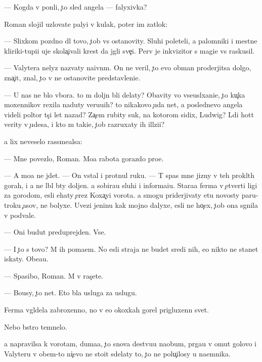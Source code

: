 \documentclass[10pt]{book}
\begin{document}
— Kogda v{\yi} pon{\ia}li, {\c}to sled angela — falyxivka?

Roman slojil uzlovat{\yi}{\y}e paly{\q}i v kulak, poter im zat{\yi}lok:

— Slixkom pozdno dl{\ia} tovo, {\c}tob{\yi} vs{\e} ostanovity. Sluhi poleteli, a palomniki i mestn{\yi}{\y}e kliriki-tupi{\q}i uje skola{\c}ivali krest da jgli sve{\c}i. Perv{\yi}{\y} je inkvizitor s magi{\y}e{\y} vs{\e} raskusil.

— Valytera nelyz{\ia} nazvaty na{\y}ivn{\yi}m. On ne veril, {\c}to {\y}evo obman proderjitsa dolgo, zna{\c}it, znal, {\c}to v{\yi} ne ostanovite predstavleni{\y}e.

— U nas ne b{\yi}lo v{\yi}bora. {\C}to m{\yi} doljn{\yi} b{\yi}li delaty? Ob{\y}avity vo vseusl{\yi}xani{\y}e, {\c}to ku{\c}ka moxennikov rexila naduty veru{\y}u{\x}ih? {\C}to nikakovo {\c}uda net, a poslednevo angela videli poltor{\yi} t{\yi}s{\ia}{\c}i let nazad? Za{\c}em rubity suk, na kotorom sidix, Ludwig? L{\iu}di hot{\ia}t verity v {\c}udesa, i kto m{\yi} taki{\y}e, {\c}tob{\yi} razruxaty ih ill{\iu}zi{\y}i?

{\Y}a lix neveselo rassme{\y}alsa:

— Mne povezlo, Roman. Mo{\y}a rabota gorazdo pro{\x}e.

— A mo{\y}a ne jdet. — On vstal i prot{\ia}nul ruku. — T{\yi} spas mne jizny v teh prokl{\ia}t{\yi}h gorah, i {\y}a ne l{\iu}bl{\iu} b{\yi}ty doljen. {\Y}a sobira{\y}u sluhi i informa{\q}i{\y}u. Stara{\y}a ferma v {\c}etverti ligi za gorodom, {\y}esli {\y}ehaty {\c}erez Koxa{\c}yi vorota. {\Y}a smogu priderjivaty etu novosty paru-tro{\y}ku {\c}asov, ne bolyxe. Uvezi jen{\x}inu kak mojno dalyxe, {\y}esli ne ho{\c}ex, {\c}tob{\yi} ona sgnila v podvale.

— Oni budut preduprejden{\yi}. Vse.

— I {\c}to s tovo? M{\yi} ih po{\y}ma{\y}em. No {\y}esli straja ne budet sredi nih, {\y}e{\y}o nikto ne stanet iskaty. Obe{\x}a{\y}u.

— Spasibo, Roman. M{\yi} v ras{\c}ete.

— Bo{\y}usy, {\c}to net. Eto b{\yi}la usluga za uslugu.



Ferma v{\yi}gl{\ia}dela zabroxenno{\y}, no v {\y}e{\y}o okoxkah gorel prigluxenn{\yi}{\y} svet.

Nebo b{\yi}stro temnelo.

{\Y}a napravilsa k vorotam, duma{\y}a, {\c}to snova de{\y}stvu{\y}u naobum, pr{\yi}ga{\y}u v omut golovo{\y} i Valyteru v ob{\x}em-to ni{\c}evo ne sto{\y}it sdelaty to, {\c}to ne polu{\c}ilosy u na{\y}emnika.
\end{document}
